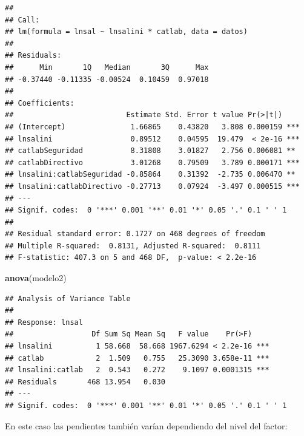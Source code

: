 \documentclass[]{book}
\newenvironment{Shaded}{\begin{snugshade}}{\end{snugshade}}
\newcommand{\KeywordTok}[1]{\textcolor[rgb]{0.13,0.29,0.53}{\textbf{#1}}}
\newcommand{\NormalTok}[1]{#1}
\begin{document}
\begin{verbatim}
## 
## Call:
## lm(formula = lnsal ~ lnsalini * catlab, data = datos)
## 
## Residuals:
##      Min       1Q   Median       3Q      Max 
## -0.37440 -0.11335 -0.00524  0.10459  0.97018 
## 
## Coefficients:
##                          Estimate Std. Error t value Pr(>|t|)    
## (Intercept)               1.66865    0.43820   3.808 0.000159 ***
## lnsalini                  0.89512    0.04595  19.479  < 2e-16 ***
## catlabSeguridad           8.31808    3.01827   2.756 0.006081 ** 
## catlabDirectivo           3.01268    0.79509   3.789 0.000171 ***
## lnsalini:catlabSeguridad -0.85864    0.31392  -2.735 0.006470 ** 
## lnsalini:catlabDirectivo -0.27713    0.07924  -3.497 0.000515 ***
## ---
## Signif. codes:  0 '***' 0.001 '**' 0.01 '*' 0.05 '.' 0.1 ' ' 1
## 
## Residual standard error: 0.1727 on 468 degrees of freedom
## Multiple R-squared:  0.8131, Adjusted R-squared:  0.8111 
## F-statistic: 407.3 on 5 and 468 DF,  p-value: < 2.2e-16
\end{verbatim}

\begin{Shaded}
\begin{Highlighting}[]
\KeywordTok{anova}\NormalTok{(modelo2)}
\end{Highlighting}
\end{Shaded}

\begin{verbatim}
## Analysis of Variance Table
## 
## Response: lnsal
##                  Df Sum Sq Mean Sq   F value    Pr(>F)    
## lnsalini          1 58.668  58.668 1967.6294 < 2.2e-16 ***
## catlab            2  1.509   0.755   25.3090 3.658e-11 ***
## lnsalini:catlab   2  0.543   0.272    9.1097 0.0001315 ***
## Residuals       468 13.954   0.030                        
## ---
## Signif. codes:  0 '***' 0.001 '**' 0.01 '*' 0.05 '.' 0.1 ' ' 1
\end{verbatim}

En este caso las pendientes también varían dependiendo del nivel del
factor:
\end{document}
